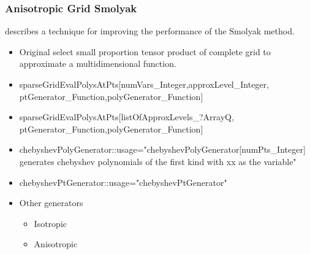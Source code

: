 \documentclass{beamer}
\begin{document}
\begin{frame}
  \frametitle{Anisotropic Grid Smolyak}
\cite{Judd2013} describes a technique for improving the performance of
the Smolyak method.
\begin{itemize}
\item Original select small proportion tensor product of complete grid to 
approximate a multidimensional function.
\item sparseGridEvalPolysAtPts[numVars\_Integer,approxLevel\_Integer,
ptGenerator\_Function,polyGenerator\_Function] 
\item sparseGridEvalPolysAtPts[listOfApproxLevels\_?ArrayQ,
ptGenerator\_Function,polyGenerator\_Function] 
\item chebyshevPolyGenerator::usage="chebyshevPolyGenerator[numPts\_Integer] generates chebyshev polynomials of the first kind with xx as the variable"
\item chebyshevPtGenerator::usage="chebyshevPtGenerator"
\item Other generators
  \begin{itemize}
  \item Isotropic 
  \item Anisotropic
  \end{itemize}
\end{itemize}

\end{frame}
\end{document}

